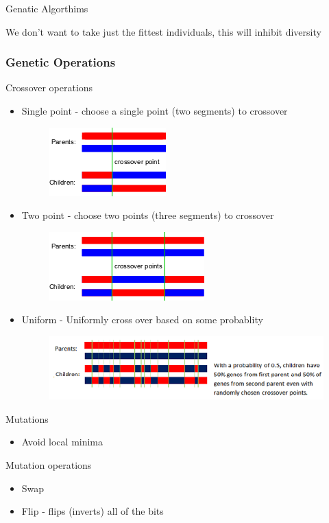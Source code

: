 \begin{frame}{Genatic Algorthims}

We don't want to take just the fittest individuals, this will inhibit diversity
\end{frame}
\begin{frame}[allowframebreaks]
  \frametitle{Genetic Operations}
  \small
  Crossover operations
  \begin{itemize}
    \tiny
    \item Single point - choose a single point (two segments) to crossover
    \begin{figure}
      \centering
      \includegraphics[width=0.2\textheight]{SinglePointCrossover.png}
    \end{figure}
    \item Two point - choose two points (three segments) to crossover
    \begin{figure}
      \centering
      \includegraphics[width=0.2\textheight]{TwoPointCrossover.png}
    \end{figure}
    \item Uniform - Uniformly cross over based on some probablity
    \begin{figure}
      \centering
      \includegraphics[width=0.2\textheight]{UniformCrossover.png}
    \end{figure}
  \end{itemize}
  \small
  Mutations
  \begin{itemize}
    \tiny
    \item Avoid local minima
  \end{itemize}
  Mutation operations
  \begin{itemize}
    \item Swap
    \item Flip - flips (inverts) all of the bits
  \end{itemize}
\end{frame}
